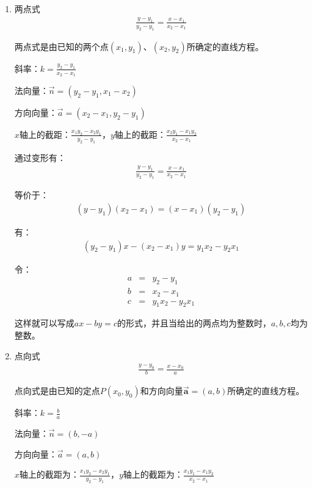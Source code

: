 \begin{enumerate}
\item 两点式 
\begin{eqnarray*}
\frac{y - y_1}{y_2 - y_1} = \frac{x - x_1}{x_2 - x_1}
\end{eqnarray*} \par
两点式是由已知的两个点$(x_1,y_1)$、$(x_2,y_2)$所确定的直线方程。\par
斜率：$k = \frac{y_2 - y_1}{x_2 - x_1}$\par
法向量：$\overrightarrow{n} = (y_2 - y_1, x_1 - x_2)$\par
方向向量：$\overrightarrow{a} = (x_2 - x_1, y_2 - y_1)$\par
$x$轴上的截距：$\frac{x_1y_2 - x_2y_1}{y_2 - y_1}$，$y$轴上的截距：$\frac{x_2y_1 - x_1y_2}{x_2 - x_1}$\par
通过变形有：
\begin{eqnarray*}
\frac{y - y_1}{y_2 - y_1} = \frac{x - x_1}{x_2 - x_1} 
\end{eqnarray*} \par
等价于：
\begin{eqnarray*}
(y - y_1)(x_2 - x_1) = (x - x_1)(y_2 - y_1)
\end{eqnarray*} \par
有：
\begin{eqnarray*}
(y_2 - y_1)x - (x_2 - x_1)y = y_1x_2 - y_2x_1
\end{eqnarray*}\par
令：
\begin{eqnarray*}
a &=& y_2 - y_1 \\
b &=& x_2 - x_1 \\
c &=& y_1x_2 - y_2x_1
\end{eqnarray*} \par
这样就可以写成$ax - by = c$的形式，并且当给出的两点均为整数时，$a, b, c$均为整数。

\item 点向式 
\begin{eqnarray*}
\frac{y - y_0}{b} = \frac{x - x_0}{a}
\end{eqnarray*} \par
点向式是由已知的定点$P(x_0,y_0)$和方向向量$\overrightarrow{\textbf{a}}=(a,b)$所确定的直线方程。\par
斜率：$k = \frac{b}{a}$\par
法向量：$\overrightarrow{n} = (b, -a)$\par
方向向量：$\overrightarrow{a} = (a, b)$\par
$x$轴上的截距为：$\frac{x_1y_2-x_2y_1}{y_2-y_1}$，$y$轴上的截距为：$\frac{x_1y_1-x_1y_2}{x_2-x_1}$\par


\end{enumerate}
